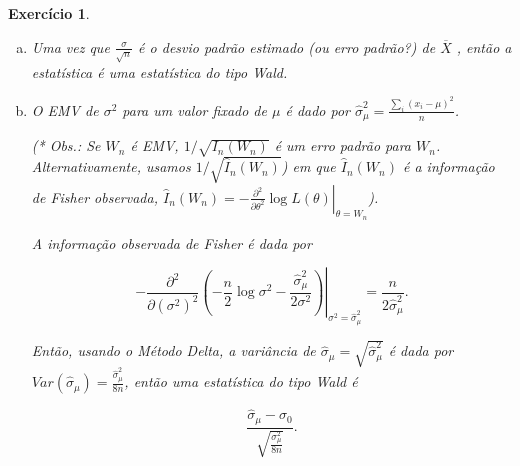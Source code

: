 \documentclass[letter,11pt]{article}
\newtheorem{exer}{Exercício}
\begin{document}

\begin{exer} \rm 

\begin{enumerate}[a)]

\item %

Uma vez que $\frac{\sigma}{\sqrt n}$ é o desvio padrão estimado (ou erro padrão?) de $\overline X$ , então a estatística é uma estatística do tipo Wald.

\item %

O EMV de $\sigma^2$ para um valor fixado de $\mu$ é dado por $\hat \sigma^2_\mu = \frac{\sum_i (x_i - \mu)^2}{n}$. 

(* Obs.: Se $W_n$ é EMV, $1 / \sqrt{I_n(W_n)}$ é um erro padrão para $W_n$. Alternativamente, usamos $1 / \sqrt{\hat{I}_n(W_n)}$) em que $\hat{I}_n(W_n)$ é a informação de Fisher observada, $\left. \hat{I}_n(W_n) = - \frac{\partial^2}{\partial \theta^2} \log L(\theta) \right|_{\theta = W_n}$).

A informação observada de Fisher é dada por 

$$\left. - \frac{\partial^2}{\partial (\sigma^2)^2} \left(- \frac{n}{2} \log \sigma^2 - \frac{\hat \sigma^2_\mu}{2 \sigma^2} \right) \right|_{\sigma^2 = \hat \sigma^2_\mu} = \frac{n}{2 \hat \sigma^2_\mu}.$$

Então, usando o Método Delta, a variância de $\hat \sigma_\mu = \sqrt{\hat \sigma^2_\mu}$ é dada por $Var(\hat \sigma_\mu) = \frac{\hat \sigma^2_\mu}{8n}$, então uma estatística do tipo Wald é

$$\frac{\hat \sigma_\mu - \sigma_0}{\sqrt{\frac{\sigma^2_\mu}{8n}}}.$$

\end{enumerate}
\end{exer}
\end{document}
